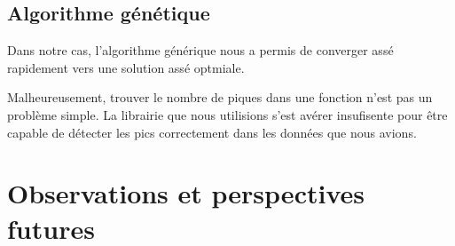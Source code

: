 \documentclass[12pt,letterpaper]{article}
\begin{document}
\subsection{Algorithme génétique}

Dans notre cas, l'algorithme générique nous a permis de converger assé rapidement vers une solution assé optmiale.

Malheureusement, trouver le nombre de piques dans une fonction n'est pas un problème simple. La librairie que nous utilisions
s'est avérer insufisente pour être capable de détecter les pics correctement dans les données que nous avions.


\section{Observations et perspectives futures}
\end{document}
